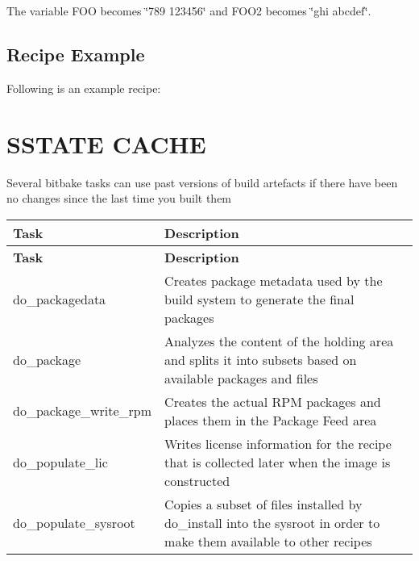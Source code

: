 \begin{DoxyItemize}
\begin{DoxyItemize}
\item The variable F\+OO becomes \char`\"{}789 123456\char`\"{} and F\+O\+O2 becomes \char`\"{}ghi abcdef\char`\"{}.
\end{DoxyItemize}
\end{DoxyItemize}

\subsection*{Recipe Example}

Following is an example recipe\+: 


\section*{S\+S\+T\+A\+TE C\+A\+C\+HE}

Several bitbake tasks can use past versions of build artefacts if there have been no changes since the last time you built them

\tabulinesep=1mm
\begin{longtabu} spread 0pt [c]{*{2}{|X[-1]}|}
\hline
\rowcolor{\tableheadbgcolor}\textbf{ Task  }&\textbf{ Description   }\\
\endfirsthead
\hline
\endfoot
\hline
\rowcolor{\tableheadbgcolor}\textbf{ Task  }&\textbf{ Description   }\\
\endhead
do\+\_\+packagedata  &Creates package metadata used by the build system to generate the final packages   \\
do\+\_\+package  &Analyzes the content of the holding area and splits it into subsets based on available packages and files   \\
do\+\_\+package\+\_\+write\+\_\+rpm  &Creates the actual R\+PM packages and places them in the Package Feed area   \\
do\+\_\+populate\+\_\+lic  &Writes license information for the recipe that is collected later when the image is constructed   \\
do\+\_\+populate\+\_\+sysroot  &Copies a subset of files installed by do\+\_\+install into the sysroot in order to make them available to other recipes   \\
\end{longtabu}


